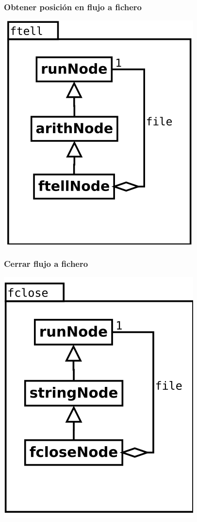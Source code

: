 \begin{multicols}{2}
\subsubsection {Obtener posición en flujo a fichero} 
   \begin{center}
   \includegraphics[scale=0.4]{ftell.png} \\
   \end{center}

   \subsubsection {Cerrar flujo a fichero} 
   \begin{center}
   \includegraphics[scale=0.4]{fclose.png} \\
   \end{center}


\end{multicols}

